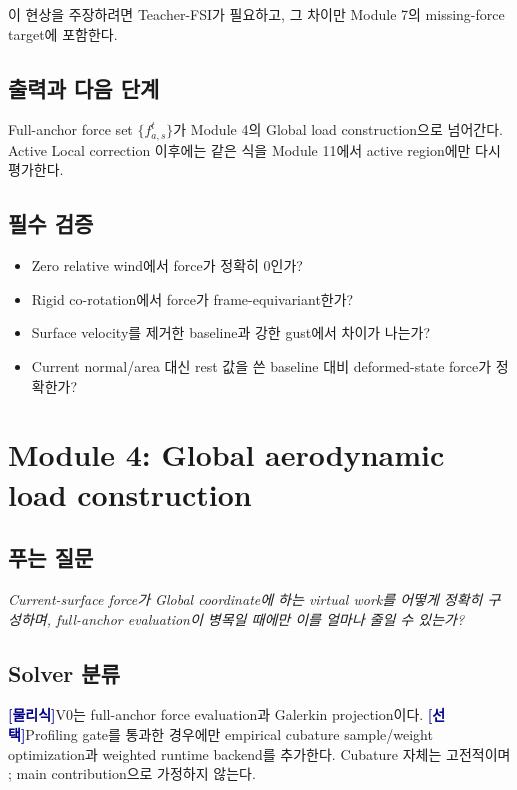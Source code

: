 \documentclass[11pt,a4paper]{article}
\newcommand{\physics}{\textcolor{darkblue}{\textbf{[물리식]}}}
\newcommand{\optional}{\textcolor{darkblue}{\textbf{[선택]}}}
\begin{document}
이 현상을 주장하려면 Teacher-FSI가 필요하고,
그 차이만 Module 7의 missing-force target에 포함한다.

\subsection*{출력과 다음 단계}

Full-anchor force set \(\{f_{a,s}^t\}\)가 Module 4의 Global load construction으로 넘어간다.
Active Local correction 이후에는 같은 식을 Module 11에서 active region에만 다시 평가한다.

\subsection*{필수 검증}

\begin{itemize}[leftmargin=1.5em]
  \item Zero relative wind에서 force가 정확히 0인가?
  \item Rigid co-rotation에서 force가 frame-equivariant한가?
  \item Surface velocity를 제거한 baseline과 강한 gust에서 차이가 나는가?
  \item Current normal/area 대신 rest 값을 쓴 baseline 대비 deformed-state force가 정확한가?
\end{itemize}

\section{Module 4: Global aerodynamic load construction}

\subsection*{푸는 질문}

\emph{Current-surface force가 Global coordinate에 하는 virtual work를 어떻게 정확히 구성하며,
full-anchor evaluation이 병목일 때에만 이를 얼마나 줄일 수 있는가?}

\subsection*{Solver 분류}

\physics V0는 full-anchor force evaluation과 Galerkin projection이다.
\optional Profiling gate를 통과한 경우에만 empirical cubature sample/weight optimization과
weighted runtime backend를 추가한다.
Cubature 자체는 고전적이며 \cite{an2008cubature}; main contribution으로 가정하지 않는다.
\end{document}
